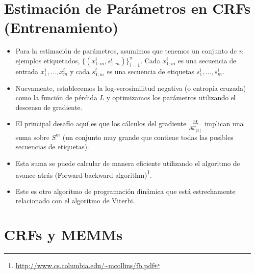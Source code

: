 \section{Estimación de Parámetros en CRFs (Entrenamiento)}

\begin{itemize}

\item Para la estimación de parámetros, asumimos que tenemos un conjunto de $n$ ejemplos etiquetados, $\{(x_{1:m}^i, s_{1:m}^i )\}_{i=1}^n$. Cada $x_{1:m}^i$ es una secuencia de entrada $x_1^i, \dots , x_m^i$ y cada $s_{1:m}^i$ es una secuencia de etiquetas $s_1^i, \dots , s_m^i$.

\item Nuevamente, establecemos la log-verosimilitud negativa (o entropía cruzada) como la función de pérdida $L$ y optimizamos los parámetros utilizando el descenso de gradiente.

\item El principal desafío aquí es que los cálculos del gradiente $\frac{\partial L}{\partial \vec{w}_{[k]}}$ implican una suma sobre $S^m$ (un conjunto muy grande que contiene todas las posibles secuencias de etiquetas).

\item Esta suma se puede calcular de manera eficiente utilizando el algoritmo de avance-atrás (Forward-backward algorithm)\footnote{\url{http://www.cs.columbia.edu/~mcollins/fb.pdf}}.

\item Este es otro algoritmo de programación dinámica que está estrechamente relacionado con el algoritmo de Viterbi.

\end{itemize}


\section{CRFs y MEMMs}

